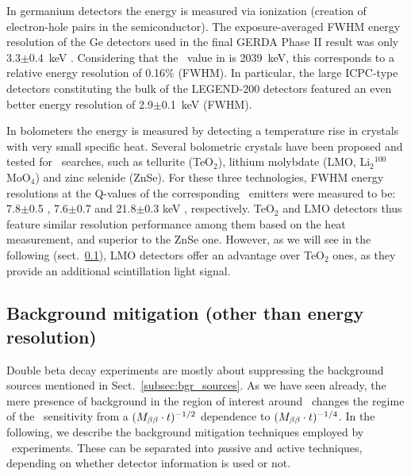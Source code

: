 In germanium detectors the energy is measured via ionization (creation of electron-hole pairs in the semiconductor). The exposure-averaged FWHM energy resolution of the Ge detectors used in the final GERDA Phase II result was only 3.3$\pm$0.4~keV \cite{GERDA:2020xhi}. Considering that the \Qbb\ value in  is 2039~keV, this corresponds to a relative energy resolution of 0.16\% (FWHM). In particular, the large ICPC-type detectors constituting the bulk of the LEGEND-200 detectors featured an even better energy resolution of 2.9$\pm$0.1~keV (FWHM). 

In bolometers the energy is measured by detecting a temperature rise in crystals with very small specific heat. Several bolometric crystals have been proposed and tested for \bb\ searches, such as tellurite (TeO$_{2}$), lithium molybdate (LMO, Li$_2$$^{100}$MoO$_4$) and zinc selenide (ZnSe). For these three technologies, FWHM energy resolutions at the Q-values of the corresponding \bb\ emitters were measured to be: 7.8$\pm$0.5 \cite{CUORE:2021mvw}, 7.6$\pm$0.7 \cite{CUPID:2020aow} and 21.8$\pm$0.3 keV \cite{CUPID:2022puj}, respectively. TeO$_{2}$ and LMO detectors thus feature similar resolution performance among them based on the heat measurement, and superior to the ZnSe one. However, as we will see in the following (sect.~\ref{subsec:bgr_mitigation}), LMO detectors offer an advantage over TeO$_{2}$ ones, as they provide an additional scintillation light signal.



 

\subsection{Background mitigation (other than energy resolution)} \label{subsec:bgr_mitigation}

Double beta decay experiments are mostly about suppressing the background sources mentioned in Sect.~\ref{subsec:bgr_sources}. As we have seen already, the mere presence of background in the region of interest around \Qbb\ changes the regime of the \mbb\ sensitivity from a $(M_{\beta\beta} \cdot t)^{-1/2}$ dependence to $(M_{\beta\beta} \cdot t)^{-1/4}$. In the following, we describe the background mitigation techniques employed by \bbonu\ experiments. These can be separated into {\emph passive} and {\emph active} techniques, depending on whether detector information is used or not.

